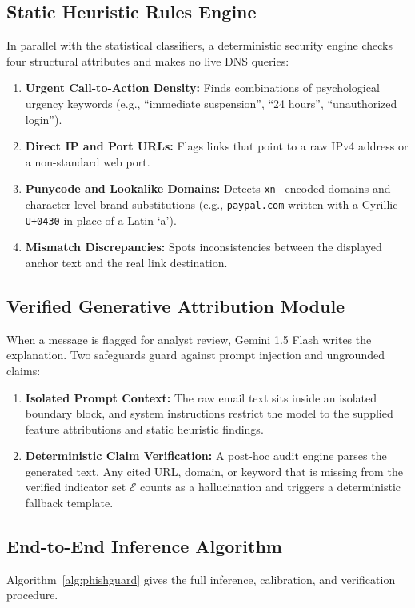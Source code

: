 \documentclass[conference]{IEEEtran}
\begin{document}
\subsection{Static Heuristic Rules Engine}
In parallel with the statistical classifiers, a deterministic security engine checks four structural attributes and makes no live DNS queries:
\begin{enumerate}
    \item \textbf{Urgent Call-to-Action Density:} Finds combinations of psychological urgency keywords (e.g., ``immediate suspension'', ``24 hours'', ``unauthorized login'').
    \item \textbf{Direct IP and Port URLs:} Flags links that point to a raw IPv4 address or a non-standard web port.
    \item \textbf{Punycode and Lookalike Domains:} Detects \texttt{xn--} encoded domains and character-level brand substitutions (e.g., \texttt{paypal.com} written with a Cyrillic \texttt{U+0430} in place of a Latin `a').
    \item \textbf{Mismatch Discrepancies:} Spots inconsistencies between the displayed anchor text and the real link destination.
\end{enumerate}

\subsection{Verified Generative Attribution Module}
When a message is flagged for analyst review, Gemini 1.5 Flash writes the explanation. Two safeguards guard against prompt injection and ungrounded claims:
\begin{enumerate}
    \item \textbf{Isolated Prompt Context:} The raw email text sits inside an isolated boundary block, and system instructions restrict the model to the supplied feature attributions and static heuristic findings.
    \item \textbf{Deterministic Claim Verification:} A post-hoc audit engine parses the generated text. Any cited URL, domain, or keyword that is missing from the verified indicator set $\mathcal{E}$ counts as a hallucination and triggers a deterministic fallback template.
\end{enumerate}

\subsection{End-to-End Inference Algorithm}
Algorithm~\ref{alg:phishguard} gives the full inference, calibration, and verification procedure.
\end{document}
